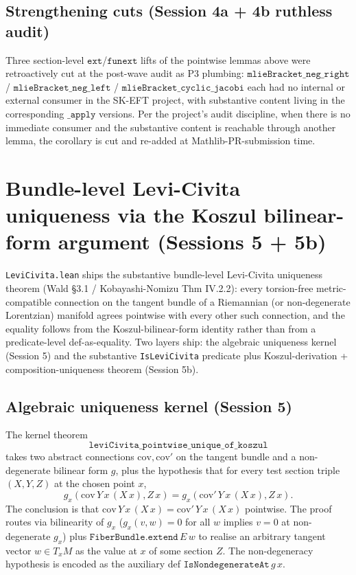 \documentclass[twocolumn]{revtex4-2}
\begin{document}
\subsection{Strengthening cuts (Session 4a + 4b ruthless audit)}

Three section-level $\texttt{ext}$/$\texttt{funext}$ lifts of the
pointwise lemmas above were retroactively cut at the post-wave audit
as P3 plumbing:
$\texttt{mlieBracket\_neg\_right}$ /
$\texttt{mlieBracket\_neg\_left}$ /
$\texttt{mlieBracket\_cyclic\_jacobi}$ each had no internal or external
consumer in the SK-EFT project, with substantive content living in the
corresponding $\texttt{\_apply}$ versions. Per the project's audit
discipline, when there is no immediate consumer and the substantive
content is reachable through another lemma, the corollary is cut and
re-added at Mathlib-PR-submission time.

\section{Bundle-level Levi-Civita uniqueness via the Koszul
bilinear-form argument (Sessions 5 + 5b)}\label{sec:levi-civita}

\texttt{LeviCivita.lean} ships the substantive bundle-level
Levi-Civita uniqueness theorem (Wald \S 3.1 / Kobayashi-Nomizu Thm
IV.2.2): every torsion-free metric-compatible connection on the
tangent bundle of a Riemannian (or non-degenerate Lorentzian) manifold
agrees pointwise with every other such connection, and the equality
follows from the Koszul-bilinear-form identity rather than from a
predicate-level def-as-equality. Two layers ship: the algebraic
uniqueness kernel (Session 5) and the substantive
\texttt{IsLeviCivita} predicate plus Koszul-derivation +
composition-uniqueness theorem (Session 5b).

\subsection{Algebraic uniqueness kernel (Session 5)}

The kernel theorem
\begin{equation*}
\texttt{leviCivita\_pointwise\_unique\_of\_koszul}
\end{equation*}
takes two abstract connections $\mathrm{cov}, \mathrm{cov}'$ on the
tangent bundle and a non-degenerate bilinear form $g$, plus the
hypothesis that for every test section triple $(X, Y, Z)$ at the
chosen point $x$,
\begin{equation*}
g_x(\mathrm{cov}\,Y\,x\,(X\,x), Z\,x) = g_x(\mathrm{cov}'\,Y\,x\,(X\,x), Z\,x).
\end{equation*}
The conclusion is that $\mathrm{cov}\,Y\,x\,(X\,x) =
\mathrm{cov}'\,Y\,x\,(X\,x)$ pointwise. The proof routes via
bilinearity of $g_x$ ($g_x(v, w) = 0$ for all $w$ implies
$v = 0$ at non-degenerate $g_x$) plus
$\texttt{FiberBundle.extend}\,E\,w$ to realise an arbitrary tangent
vector $w \in T_xM$ as the value at $x$ of some section $Z$. The
non-degeneracy hypothesis is encoded as the auxiliary def
$\texttt{IsNondegenerateAt}\,g\,x$.
\end{document}
